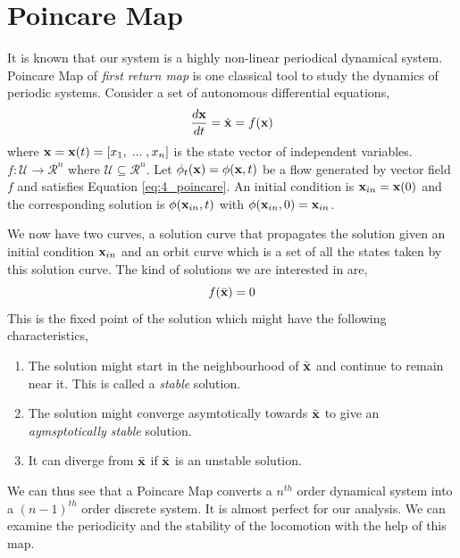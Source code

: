 \section{Poincare Map}
It is known that our system is a highly non-linear periodical dynamical system. Poincare Map of \textit{ first return map} is one classical tool to study the dynamics of periodic systems. Consider a set of autonomous differential equations,
\begin{equation}
 \frac{d {\bf x}}{d t} = \dot{{\bf x}} = f({\bf x})
\label{eq:4_poincare}
\end{equation}
where ${\bf x} = {\bf x}(t) = [x_1,\;...\;,x_n]$ is the state vector of independent variables. $f : \mathcal{U} \to \mathcal{R}^n$ where $\mathcal{U} \subseteq \mathcal{R}^n$. Let $\phi_t({\bf x}) = \phi({\bf x}, t)$ be a flow generated by vector field $f$ and satisfies Equation \ref{eq:4_poincare}. An initial condition is ${\bf x}_{in} = {\bf x}(0)$ and the corresponding solution is $\phi({\bf x}_{in}, t)$ with $\phi({\bf x}_{in}, 0) = {\bf x}_{in}$.

We now have two curves, a solution curve that propagates the solution given an initial condition ${\bf x}_{in}$ and an orbit curve which is a set of all the states taken by this solution curve. The kind of solutions we are interested in are,
\begin{equation}
 f(\bar{{\bf x}}) = 0
\end{equation}
This is the fixed point of the solution which might have the following characteristics,
\begin{enumerate}
  \item
  The solution might start in the neighbourhood of $\bar{\bf x}$ and continue to remain near it. This is called a \textit{stable} solution.
  \item
  The solution might converge asymtotically towards $\bar{\bf x}$ to give an \textit{aymsptotically stable} solution.
  \item
  It can diverge from $\bar{\bf x}$ if $\bar{\bf x}$ is an unstable solution.
\end{enumerate}
We can thus see that a Poincare Map converts a $n^{th}$ order dynamical system into a $(n-1)^{th}$ order discrete system. It is almost perfect for our analysis. We can examine the periodicity and the stability of the locomotion with the help of this map.\\

